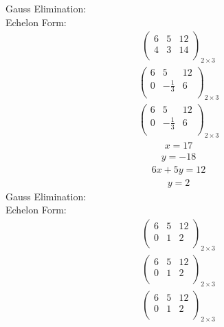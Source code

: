 \documentclass{article}
\begin{document}
Gauss Elimination:\\
Echelon Form:\\
\begin{align*}
\left(
\begin{array}{cc|c}
6 & 5 & 12\\
4 & 3 & 14\\
\end{array}
\right)_{2\times 3}
\end{align*}
\begin{align*}
\left(
\begin{array}{cc|c}
6 & 5 & 12\\
0 & -\frac{1}{3} & 6\\
\end{array}
\right)_{2\times 3}
\end{align*}
\begin{align*}
\left(
\begin{array}{cc|c}
6 & 5 & 12\\
0 & -\frac{1}{3} & 6\\
\end{array}
\right)_{2\times 3}
\end{align*}
\begin{align*}
x=17\end{align*}
\begin{align*}
y=-18\end{align*}
\begin{align*}
6x + 5y=12\end{align*}
\begin{align*}
y=2\end{align*}
Gauss Elimination:\\
Echelon Form:\\
\begin{align*}
\left(
\begin{array}{cc|c}
6 & 5 & 12\\
0 & 1 & 2\\
\end{array}
\right)_{2\times 3}
\end{align*}
\begin{align*}
\left(
\begin{array}{cc|c}
6 & 5 & 12\\
0 & 1 & 2\\
\end{array}
\right)_{2\times 3}
\end{align*}
\begin{align*}
\left(
\begin{array}{cc|c}
6 & 5 & 12\\
0 & 1 & 2\\
\end{array}
\right)_{2\times 3}
\end{align*}
\end{document}
